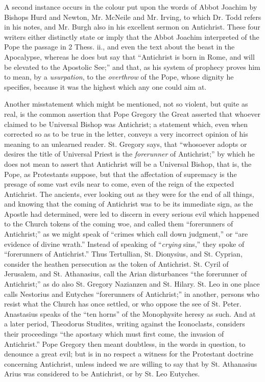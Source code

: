 A second instance occurs in the colour put upon the words of Abbot
Joachim by Bishops Hurd and Newton, Mr. McNeile and Mr. Irving, to
which Dr. Todd refers in his notes, and Mr. Burgh also in his
excellent sermon on Antichrist. These four writers either distinctly
state or imply that the Abbot Joachim interpreted of the Pope the
passage in 2 Thess. ii., and even the text about the beast in the
Apocalypse, whereas he does but say that ``Antichrist is born in
Rome, and will be elevated to the Apostolic See;'' and that, as
his system of prophecy proves him to mean, by a \emph{usurpation}, to
the \emph{overthrow} of the Pope, whose dignity he specifies, because
it was the highest which any one could aim at.

Another misstatement which might be mentioned, not so violent, but
quite as real, is the common assertion that Pope Gregory the Great
asserted that whoever claimed to be Universal Bishop was Antichrist; a
statement which, even when corrected so as to be true in the letter, conveys a very incorrect opinion of his meaning to an
unlearned reader. St. Gregory says, that ``whosoever adopts or
desires the title of Universal Priest is the \emph{forerunner} of
Antichrist;'' by which he does not mean to assert that Antichrist
will be a Universal Bishop, that is, the Pope, as Protestants suppose,
but that the affectation of supremacy is the presage of some vast
evils near to come, even of the reign of the expected Antichrist. The
ancients, ever looking out as they were for the end of all things, and
knowing that the coming of Antichrist was to be its immediate sign, as
the Apostle had determined, were led to discern in every serious evil
which happened to the Church tokens of the coming woe, and called them
``forerunners of Antichrist;'' as we might speak of
``crimes which call down judgment,'' or ``are evidence of
divine wrath.'' Instead of speaking of ``\emph{crying}
sins,'' they spoke of ``forerunners of Antichrist.'' Thus
Tertullian, St. Dionysius, and St. Cyprian, consider the heathen
persecution as the token of Antichrist. St. Cyril of Jerusalem, and
St. Athanasius, call the Arian disturbances ``the forerunner of
Antichrist;'' as do also St. Gregory Nazianzen and St. Hilary. St.
Leo in one place calls Nestorius and Eutyches ``forerunners of
Antichrist;'' in another, persons who resist what the Church has
once settled, or who oppose the see of St. Peter. Anastasius speaks of
the ``ten horns'' of the Monophysite heresy as such. And at a
later period, Theodorus Studites, writing against the Iconoclasts,
considers their proceedings ``the apostasy which must first come,
the invasion of Antichrist.'' Pope Gregory then meant doubtless,
in the words in question, to denounce a great evil; but is in no
respect a witness for the Protestant doctrine concerning Antichrist,
unless indeed we are willing to say that by St. Athanasius Arius
was considered to be Antichrist, or by St. Leo Eutyches.

